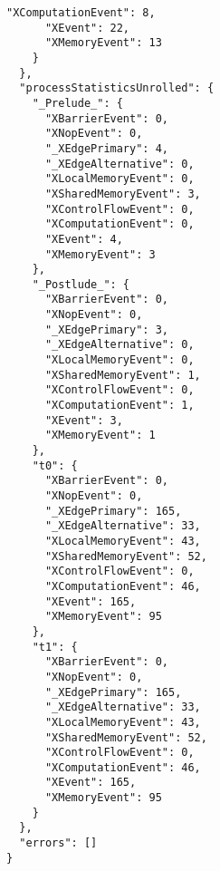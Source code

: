 \begin{multicols*}{2}
\begin{lstlisting}[basicstyle=\footnotesize\ttfamily]
      "XComputationEvent": 8,
      "XEvent": 22,
      "XMemoryEvent": 13
    }
  },
  "processStatisticsUnrolled": {
    "_Prelude_": {
      "XBarrierEvent": 0,
      "XNopEvent": 0,
      "_XEdgePrimary": 4,
      "_XEdgeAlternative": 0,
      "XLocalMemoryEvent": 0,
      "XSharedMemoryEvent": 3,
      "XControlFlowEvent": 0,
      "XComputationEvent": 0,
      "XEvent": 4,
      "XMemoryEvent": 3
    },
    "_Postlude_": {
      "XBarrierEvent": 0,
      "XNopEvent": 0,
      "_XEdgePrimary": 3,
      "_XEdgeAlternative": 0,
      "XLocalMemoryEvent": 0,
      "XSharedMemoryEvent": 1,
      "XControlFlowEvent": 0,
      "XComputationEvent": 1,
      "XEvent": 3,
      "XMemoryEvent": 1
    },
    "t0": {
      "XBarrierEvent": 0,
      "XNopEvent": 0,
      "_XEdgePrimary": 165,
      "_XEdgeAlternative": 33,
      "XLocalMemoryEvent": 43,
      "XSharedMemoryEvent": 52,
      "XControlFlowEvent": 0,
      "XComputationEvent": 46,
      "XEvent": 165,
      "XMemoryEvent": 95
    },
    "t1": {
      "XBarrierEvent": 0,
      "XNopEvent": 0,
      "_XEdgePrimary": 165,
      "_XEdgeAlternative": 33,
      "XLocalMemoryEvent": 43,
      "XSharedMemoryEvent": 52,
      "XControlFlowEvent": 0,
      "XComputationEvent": 46,
      "XEvent": 165,
      "XMemoryEvent": 95
    }
  },
  "errors": []
}
\end{lstlisting}
\end{multicols*}

